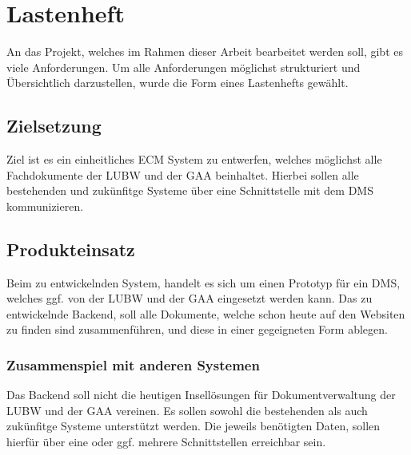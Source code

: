 \section{Lastenheft}
An das Projekt, welches im Rahmen dieser Arbeit bearbeitet werden soll, gibt es viele Anforderungen. Um alle Anforderungen m\"oglichst strukturiert und \"Ubersichtlich darzustellen, wurde die Form eines Lastenhefts gew\"ahlt.

\subsection{Zielsetzung}
Ziel ist es ein einheitliches \ac{ECM} System zu entwerfen, welches m\"oglichst alle Fachdokumente der \ac{LUBW} und der \ac{GAA} beinhaltet.
Hierbei sollen alle bestehenden und zuk\"unfitge Systeme \"uber eine Schnittstelle mit dem \ac{DMS} kommunizieren.

\subsection{Produkteinsatz}
Beim zu entwickelnden System, handelt es sich um einen Prototyp f\"ur ein \ac{DMS}, welches ggf. von der \ac{LUBW} und der \ac{GAA} eingesetzt werden kann. Das zu entwickelnde Backend, soll alle Dokumente, welche schon heute auf den Websiten zu finden sind zusammenf\"uhren, und diese in einer gegeigneten Form ablegen.

\subsubsection{Zusammenspiel mit anderen Systemen}
Das Backend soll nicht die heutigen Insell\"osungen f\"ur Dokumentverwaltung der \ac{LUBW} und der \ac{GAA} vereinen. Es sollen sowohl die bestehenden als auch zuk\"unfitge Systeme unterst\"utzt werden. Die jeweils ben\"otigten Daten, sollen hierf\"ur \"uber eine oder ggf. mehrere Schnittstellen erreichbar sein.

